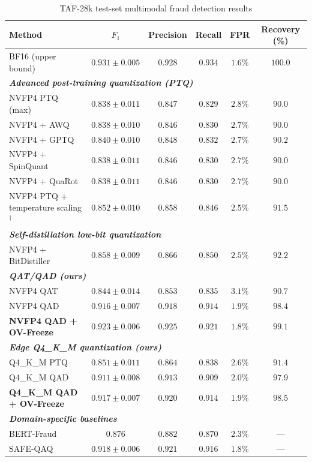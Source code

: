 \documentclass[final,5p,times,number]{elsarticle}
\begin{document}
\begin{table}[h]
\centering
\caption{TAF-28k test-set multimodal fraud detection results}
\label{tab3-en}
\small
\renewcommand{\arraystretch}{1.2}
\begin{tabularx}{\textwidth}{Xccccc}
\toprule
\textbf{Method} & \textbf{$F_1$} & \textbf{Precision} & \textbf{Recall} & \textbf{FPR} & \textbf{Recovery (\%)} \\
\midrule
BF16 (upper bound) & $0.931 \pm 0.005$ & $0.928$ & $0.934$ & $1.6\%$ & $100.0$ \\
\midrule
\multicolumn{6}{l}{\emph{\textbf{Advanced post-training quantization (PTQ)}}} \\
NVFP4 PTQ (max) & $0.838 \pm 0.011$ & $0.847$ & $0.829$ & $2.8\%$ & $90.0$ \\
NVFP4 + AWQ & $0.838 \pm 0.010$ & $0.846$ & $0.830$ & $2.7\%$ & $90.0$ \\
NVFP4 + GPTQ & $0.840 \pm 0.010$ & $0.848$ & $0.832$ & $2.7\%$ & $90.2$ \\
NVFP4 + SpinQuant & $0.838 \pm 0.011$ & $0.846$ & $0.830$ & $2.7\%$ & $90.0$ \\
NVFP4 + QuaRot & $0.838 \pm 0.011$ & $0.846$ & $0.830$ & $2.7\%$ & $90.0$ \\
NVFP4 PTQ + temperature scaling$^\dagger$ & $0.852 \pm 0.010$ & $0.858$ & $0.846$ & $2.5\%$ & $91.5$ \\
\midrule
\multicolumn{6}{l}{\emph{\textbf{Self-distillation low-bit quantization}}} \\
NVFP4 + BitDistiller & $0.858 \pm 0.009$ & $0.866$ & $0.850$ & $2.5\%$ & $92.2$ \\
\midrule
\multicolumn{6}{l}{\emph{\textbf{QAT/QAD (ours)}}} \\
NVFP4 QAT & $0.844 \pm 0.014$ & $0.853$ & $0.835$ & $3.1\%$ & $90.7$ \\
NVFP4 QAD & $0.916 \pm 0.007$ & $0.918$ & $0.914$ & $1.9\%$ & $98.4$ \\
\rowcolor[gray]{0.93} \textbf{NVFP4 QAD + OV-Freeze} & $\mathbf{0.923 \pm 0.006}$ & $\mathbf{0.925}$ & $\mathbf{0.921}$ & $\mathbf{1.8\%}$ & $\mathbf{99.1}$ \\
\midrule
\multicolumn{6}{l}{\emph{\textbf{Edge Q4\_K\_M quantization (ours)}}} \\
Q4\_K\_M PTQ & $0.851 \pm 0.011$ & $0.864$ & $0.838$ & $2.6\%$ & $91.4$ \\
Q4\_K\_M QAD & $0.911 \pm 0.008$ & $0.913$ & $0.909$ & $2.0\%$ & $97.9$ \\
\rowcolor[gray]{0.93} \textbf{Q4\_K\_M QAD + OV-Freeze} & $\mathbf{0.917 \pm 0.007}$ & $\mathbf{0.920}$ & $\mathbf{0.914}$ & $\mathbf{1.9\%}$ & $\mathbf{98.5}$ \\
\midrule
\multicolumn{6}{l}{\emph{\textbf{Domain-specific baselines}}} \\
BERT-Fraud & $0.876$ & $0.882$ & $0.870$ & $2.3\%$ & --- \\
SAFE-QAQ & $0.918 \pm 0.006$ & $0.921$ & $0.916$ & $1.8\%$ & --- \\
\bottomrule
\end{tabularx}
\end{table}
\end{document}
